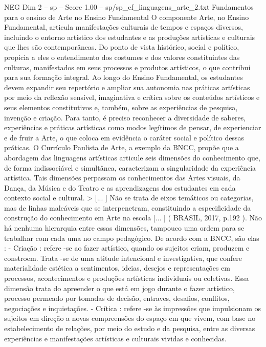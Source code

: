 \begin{textsample}{NEG Dim 2 – sp – Score 1.00 – sp/sp\_ef\_linguagens\_arte\_2.txt}  \label{ex:f2_neg_086}
Fundamentos para o ensino de Arte no Ensino Fundamental O componente Arte, no Ensino Fundamental, articula manifestações culturais de tempos e espaços diversos, incluindo o entorno artístico dos estudantes e as produções artísticas e culturais que lhes são contemporâneas.
Do ponto de vista histórico, social e político, propicia a eles o entendimento dos costumes e dos valores constituintes das culturas, manifestados em seus processos e produtos artísticos, o que contribui para sua formação integral.
Ao longo do Ensino Fundamental, os estudantes devem expandir seu repertório e ampliar sua autonomia nas práticas artísticas por meio da reflexão sensível, imaginativa e crítica sobre os conteúdos artísticos e seus elementos constitutivos e, também, sobre as experiências de pesquisa, invenção e criação.
Para tanto, é preciso reconhecer a diversidade de saberes, experiências e práticas artísticas como modos legítimos de pensar, de experienciar e de fruir a Arte, o que coloca em evidência o caráter social e político dessas práticas.
O Currículo Paulista de Arte, a exemplo da BNCC, propõe que a abordagem das linguagens artísticas articule seis dimensões do conhecimento que, de forma indissociável e simultânea, caracterizam a singularidade da experiência artística.
Tais dimensões perpassam os conhecimentos das Artes visuais, da Dança, da Música e do Teatro e as aprendizagens dos estudantes em cada contexto social e cultural. > [... ] Não se trata de eixos temáticos ou categorias, mas de linhas maleáveis que se interpenetram, constituindo a especificidade da construção do conhecimento em Arte na escola [... ] ( BRASIL, 2017, p.192 ).
Não há nenhuma hierarquia entre essas dimensões, tampouco uma ordem para se trabalhar com cada uma no campo pedagógico.
De acordo com a BNCC, são elas : - Criação : refere -se ao fazer artístico, quando os sujeitos criam, produzem e constroem.
Trata -se de uma atitude intencional e investigativa, que confere materialidade estética a sentimentos, ideias, desejos e representações em processos, acontecimentos e produções artísticas individuais ou coletivas.
Essa dimensão trata do apreender o que está em jogo durante o fazer artístico, processo permeado por tomadas de decisão, entraves, desafios, conflitos, negociações e inquietações. - Crítica : refere -se às impressões que impulsionam os sujeitos em direção a novas compreensões do espaço em que vivem, com base no estabelecimento de relações, por meio do estudo e da pesquisa, entre as diversas experiências e manifestações artísticas e culturais vividas e conhecidas.

\end{textsample}
